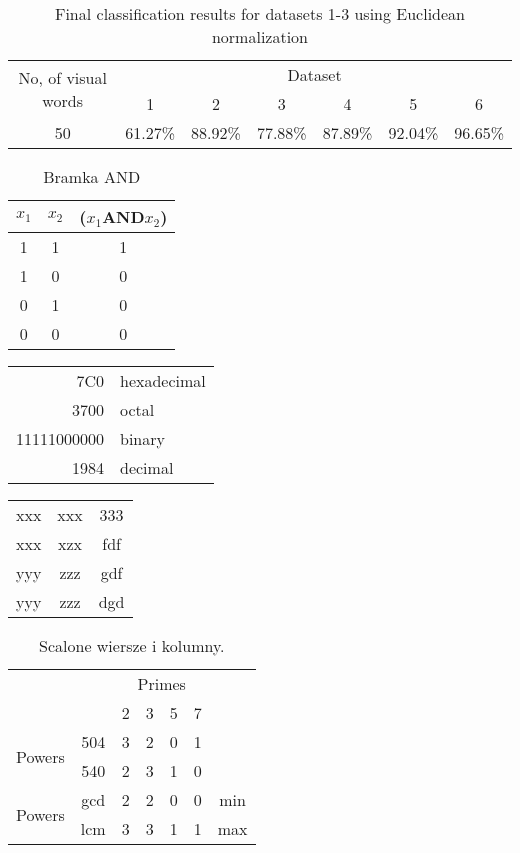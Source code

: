 \documentclass{article}
\begin{document}
\begin{table}
\centering
\begin{tabular}{|c|c|c|c|c|c|c|}
\hline
\multirow{2}{*}{No, of visual words}& \multicolumn{6}{c|}{Dataset} \\ \cline{2-7}
&1&2&3&4&5&6 \\ \hline
50&61.27\%&88.92\%&77.88\%&87.89\%&92.04\%&96.65\% \\
\hline
		\end{tabular}
	\caption{Final classification results for datasets 1-3 using Euclidean normalization}
	\label{tab:dane}
\end{table}
\begin{table}
\centering
\caption{Bramka AND}
\begin{tabular}{c|c|c}
\hline
\hline
$x_1$&$x_2$&($x_1$AND$x_2$) \\ \hline
1&1&1 \\ 
1&0&0 \\ 
0&1&0 \\ 
0&0&0 \\ \hline
\hline
\end{tabular}
\end{table}
\begin{tabular}{|r|l|}
\hline
7C0&hexadecimal \\
3700&octal \\ \cline {2-2}
11111000000& binary \\
\hline \hline
1984&decimal \\
\hline
\end{tabular}
\begin{table}
\centering
{}
\begin{tabular}{ccc}
xxx&xxx&333 \\
xxx&xzx&fdf \\
yyy&zzz&gdf \\
yyy&zzz&dgd \\
\end{tabular}
\end{table}
\begin{table}
\centering
\caption{Scalone wiersze i kolumny.}
\begin{tabular}{|c|c|c|c|c|c|c}
\cline{3-6}
& & \multicolumn{4}{c|}{Primes} \\ \cline{3-6}
& & 2&3&5&7 \\ \cline{1-6}
\multirow{2}{*}{Powers}
&504&3&2&0&1 \\ \cline{2-6}
&540&2&3&1&0 \\ \cline{1-6}
\multirow{2}{*}{Powers}
&gcd&2&2&0&0&min \\ \cline{2-6}
&lcm&3&3&1&1&max \\ \cline{1-6}
\end{tabular}
\end{table}
\end{document}
